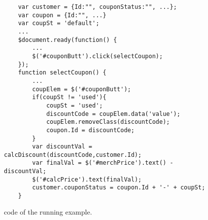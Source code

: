 \begin{figure}
\begin{lstlisting}
	var customer = {Id:"", couponStatus:"", ...};
	var coupon = {Id:"", ...}
	var coupSt = 'default';
	...
	$document.ready(function() {
		...
		$('#couponButt').click(selectCoupon);
	});
	function selectCoupon() {
		...
		coupElem = $('#couponButt');
		if(coupSt != 'used'){
			coupSt = 'used';
			discountCode = coupElem.data('value');
			coupElem.removeClass(discountCode); 
			coupon.Id = discountCode;
		}
		var discountVal = calcDiscount(discountCode,customer.Id);
		var finalVal = $('#merchPrice').text() - discountVal;
		$('#calcPrice').text(finalVal);
		customer.couponStatus = coupon.Id + '-' + coupSt;  
	}

\end{lstlisting}
\vspace{-0.1in} 

\caption{\javascript code of the running example.}
\label{Fig:example}
\vspace{-0.2in} 

\end{figure}